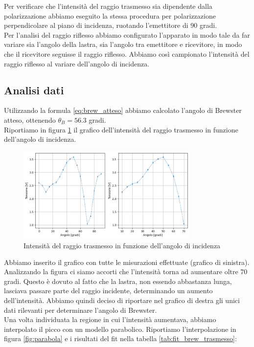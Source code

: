 \documentclass[letterpaper,12pt]{article}
\begin{document}
Per verificare che l'intensità del raggio trasmesso sia dipendente dalla polarizzazione abbiamo
eseguito la stessa procedura per polarizzazione perpendicolare al piano di incidenza,
ruotando l'emettitore di 90 gradi. \\

Per l'analisi del raggio riflesso abbiamo configurato l'apparato in modo tale da far variare sia l'angolo della 
lastra, sia l'angolo tra emettitore e ricevitore, in modo che il ricevitore seguisse il raggio riflesso. Abbiamo 
così campionato l'intensità del raggio riflesso al variare dell'angolo di incidenza.\\

\subsection{Analisi dati}

Utilizzando la formula \ref{eq:brew_atteso} abbiamo calcolato l'angolo di Brewster atteso, 
ottenendo $\theta_B = 56.3$ gradi.\\

Riportiamo in figura \ref{fig:trasmesso} il grafico dell'intensità del raggio trasmesso in funzione 
dell'angolo di incidenza.\\
\begin{figure}[h!]
	\centering
	\includegraphics[width = 0.8\textwidth]{trasmesso.png}
	\caption{Intensità del raggio trasmesso in funzione dell'angolo di incidenza}
	\label{fig:trasmesso}
\end{figure}

Abbiamo inserito il grafico con tutte le misurazioni effettuate (grafico di sinistra). Analizzando la figura ci
siamo accorti che l'intensità torna ad aumentare oltre 70 gradi. Questo è dovuto al fatto che la lastra, non 
essendo abbastanza lunga, lasciava passare parte del raggio incidente, determinando un aumento dell'intensità. 
Abbiamo quindi deciso di riportare nel grafico di destra gli unici dati rilevanti per determinare l'angolo di Brewster.\\
Una volta individuata la regione in cui l'intensità aumentava, abbiamo interpolato il picco con un modello parabolico.
Riportiamo l'interpolazione in figura \ref{fig:parabola} e i risultati del fit nella tabella 
\ref{tab:fit_brew_trasmesso}: 
\end{document}
